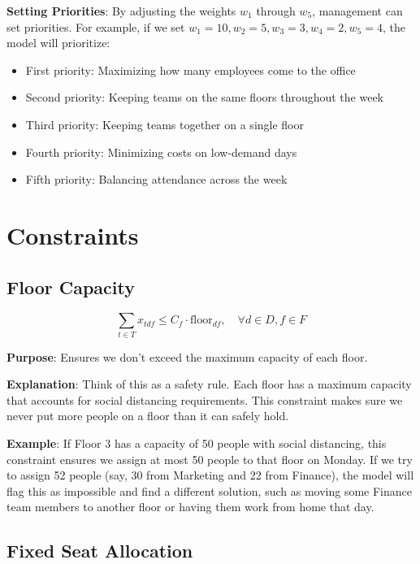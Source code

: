 \documentclass[12pt,a4paper]{article}
\begin{document}
\textbf{Setting Priorities}: By adjusting the weights $w_1$ through $w_5$, management can set priorities. For example, if we set $w_1 = 10, w_2 = 5, w_3 = 3, w_4 = 2, w_5 = 4$, the model will prioritize:
\begin{itemize}
\item First priority: Maximizing how many employees come to the office
\item Second priority: Keeping teams on the same floors throughout the week
\item Third priority: Keeping teams together on a single floor
\item Fourth priority: Minimizing costs on low-demand days
\item Fifth priority: Balancing attendance across the week
\end{itemize}

\section{Constraints}

\subsection{Floor Capacity}

\begin{equation}
\sum_{t\in T} x_{tdf} \leq C_f \cdot \text{floor}_{df}, \quad \forall d \in D, f \in F
\end{equation}

\textbf{Purpose}: Ensures we don't exceed the maximum capacity of each floor.

\textbf{Explanation}: Think of this as a safety rule. Each floor has a maximum capacity that accounts for social distancing requirements. This constraint makes sure we never put more people on a floor than it can safely hold.

\textbf{Example}: If Floor 3 has a capacity of 50 people with social distancing, this constraint ensures we assign at most 50 people to that floor on Monday. If we try to assign 52 people (say, 30 from Marketing and 22 from Finance), the model will flag this as impossible and find a different solution, such as moving some Finance team members to another floor or having them work from home that day.

\subsection{Fixed Seat Allocation}
\end{document}
